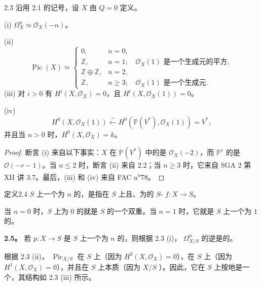 \begin{SGAresult}{}{2.3}
沿用 2.1 的记号，设 $X$ 由 $Q=0$ 定义。

\noindent (i) $\Omega_X^n\simeq\mathscr O_X(-n)$。

\noindent (ii)
\[
\operatorname{Pic}(X)\simeq
\begin{cases}
0,&n=0,\\
\mathbb Z,&n=1;\quad\mathscr O_X(1)\text{ 是一个生成元的平方},\\
\mathbb Z\oplus\mathbb Z,&n=2,\\
\mathbb Z,&n\ge3;\quad\mathscr O_X(1)\text{ 是一个生成元}.
\end{cases}
\]
\noindent (iii) 对 $i>0$ 有 $H^i(X,\mathscr O_X)=0$，且 $H^i(X,\mathscr O_X(1))=0$。

\noindent (iv)
\[
H^0(X,\mathscr O_X(1))\xleftarrow{\sim}H^0(\mathbb P(V^*),\mathscr O_X(1))=V^*,
\]
并且当 $n>0$ 时，$H^0(X,\mathscr O_X)=k$。
\end{SGAresult}
\begin{proof}
断言 (i) 来自以下事实：$X$ 在 $\mathbb P(V^*)$ 中的是 $\mathscr O_X(-2)$，而 $\mathbb P^r$ 的是 $\mathscr O(-r-1)$。当 $n\le2$ 时，断言 (ii) 来自 2.2；当 $n\ge3$ 时，它来自 SGA 2 第 XII 讲 3.7。最后，(iii) 和 (iv) 来自 FAC n\textsuperscript{o}78。
\end{proof}

\begin{SGAresult}{定义}{2.4}
 $S$ 上一个为 $n$ 的，是指在 $S$ 上且、为的 $S$- $f:X\to S$。
\end{SGAresult}
当 $n=0$ 时，$S$ 上为 $0$ 的就是 $S$ 的一个双重。当 $n=1$ 时，它就是 $S$ 上一个为 $1$ 的。

\textbf{2.5。} 若 $p:X\to S$ 是 $S$ 上一个为 $n$ 的，则根据 2.3 (i)， $\Omega_{X/S}^n$ 的逆是的。

根据 2.3 (ii)， $\operatorname{Pic}_{X/S}$ 在 $S$ 上（因为 $H^2(X,\mathscr O_X)=0$），在 $S$ 上（因为 $H^1(X,\mathscr O_X)=0$），并且在 $S$ 上本质（因为 $X/S$ ）。因此，它在 $S$ 上按地是一个，其结构如 2.3 (iii) 所示。

